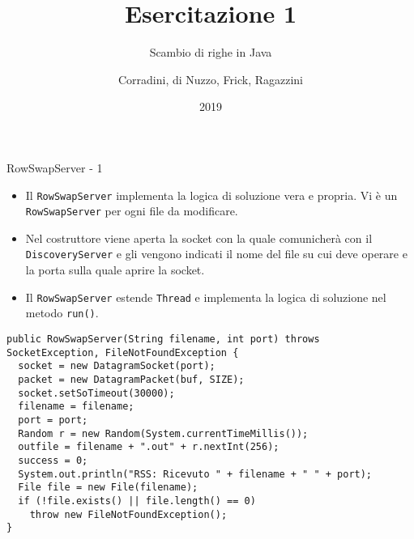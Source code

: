 \documentclass[8pt]{beamer}
\begin{document}
\title{Esercitazione 1}
\subtitle{Scambio di righe in Java}
\author{Corradini, di Nuzzo, Frick, Ragazzini}
\date{2019}
\begin{frame}
\titlepage
\end{frame}
\begin{frame}[fragile]{RowSwapServer - 1}
\vspace{0.9em}
\begin{itemize}
\linespread{1.2}
\item Il \texttt{RowSwapServer} implementa la logica di soluzione vera e propria.
Vi è un \texttt{RowSwapServer} per ogni file da modificare.
\item Nel costruttore viene aperta la socket con la quale comunicherà con il \texttt{DiscoveryServer} e gli vengono indicati il nome del file su cui deve operare e la porta sulla quale aprire la socket. 
\item Il \texttt{RowSwapServer} estende \texttt{Thread} e implementa la logica di soluzione nel metodo \texttt{run()}.
\vspace{1.5em}
\end{itemize}
\begin{verbatim}
public RowSwapServer(String filename, int port) throws SocketException, FileNotFoundException {
  socket = new DatagramSocket(port);
  packet = new DatagramPacket(buf, SIZE);
  socket.setSoTimeout(30000);
  filename = filename;
  port = port;
  Random r = new Random(System.currentTimeMillis());
  outfile = filename + ".out" + r.nextInt(256);
  success = 0;
  System.out.println("RSS: Ricevuto " + filename + " " + port);
  File file = new File(filename);
  if (!file.exists() || file.length() == 0)
    throw new FileNotFoundException();
}
\end{verbatim}
\end{frame}
\end{document}
